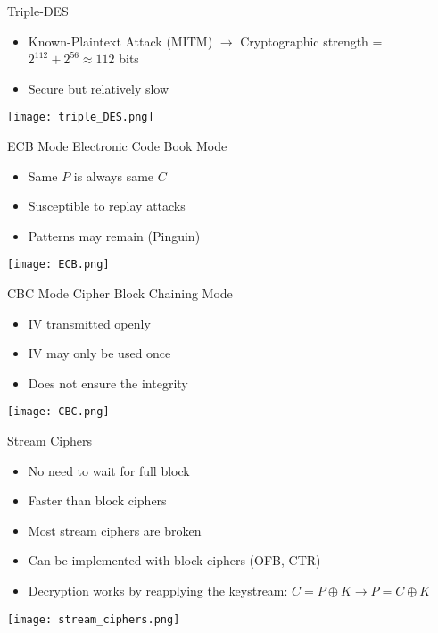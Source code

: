 \begin{concept}{Triple-DES}
    \begin{itemize}
        \item Known-Plaintext Attack (MITM) $\rightarrow$ Cryptographic strength = $2^{112} + 2^{56} \approx 112$ bits
        \item Secure but relatively slow
    \end{itemize}
    \texttt{[image: triple\_DES.png]}
\end{concept}

\multend



\begin{definition}{ECB Mode} Electronic Code Book Mode
    \begin{itemize}
        \item Same $P$ is always same $C$
        \item Susceptible to replay attacks
        \item Patterns may remain (Pinguin)
    \end{itemize}
    \texttt{[image: ECB.png]}
\end{definition}


\begin{concept}{CBC Mode} Cipher Block Chaining Mode
    \begin{itemize}
        \item IV transmitted openly
        \item IV may only be used once
        \item Does not ensure the integrity
    \end{itemize}
    \texttt{[image: CBC.png]}
\end{concept}

\multend



\begin{definition}{Stream Ciphers}
    \begin{itemize}
        \item No need to wait for full block
        \item Faster than block ciphers
        \item Most stream ciphers are broken
        \item Can be implemented with block ciphers (OFB, CTR)
        \item Decryption works by reapplying the keystream: $C = P \oplus K \rightarrow P = C \oplus K$
    \end{itemize}
    \texttt{[image: stream\_ciphers.png]}
\end{definition}

